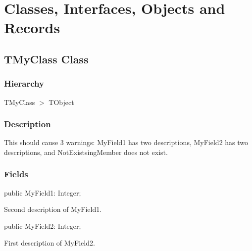 \documentclass{report}
\newif\ifpdf
\begin{document}
\section{Classes, Interfaces, Objects and Records}
\ifpdf
\subsection*{\large{\textbf{TMyClass Class}}\normalsize\hspace{1ex}\hrulefill}
\else
\subsection*{TMyClass Class}
\fi
\label{warning_value_member_tags.TMyClass}
\subsubsection*{\large{\textbf{Hierarchy}}\normalsize\hspace{1ex}\hfill}
TMyClass {$>$} TObject
\subsubsection*{\large{\textbf{Description}}\normalsize\hspace{1ex}\hfill}


 



This should cause 3 warnings: MyField1 has two descriptions, MyField2 has two descriptions, and NotExistsingMember does not exist.\subsubsection*{\large{\textbf{Fields}}\normalsize\hspace{1ex}\hfill}
\begin{list}{}{
\setlength{\itemindent}{0cm}
\setlength{\listparindent}{0cm}
\setlength{\leftmargin}{\evensidemargin}
\addtolength{\leftmargin}{\tmplength}
\settowidth{\labelsep}{X}
\addtolength{\leftmargin}{\labelsep}
\setlength{\labelwidth}{\tmplength}
}
\label{warning_value_member_tags.TMyClass-MyField1}
\item[\textbf{MyField1}\hfill]
\ifpdf
\begin{flushleft}
\fi
\begin{ttfamily}
public MyField1: Integer;\end{ttfamily}

\ifpdf
\end{flushleft}
\fi


\par Second description of MyField1.\label{warning_value_member_tags.TMyClass-MyField2}
\item[\textbf{MyField2}\hfill]
\ifpdf
\begin{flushleft}
\fi
\begin{ttfamily}
public MyField2: Integer;\end{ttfamily}

\ifpdf
\end{flushleft}
\fi


\par First description of MyField2.\end{list}
\end{document}
